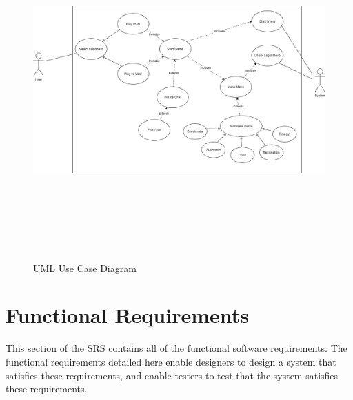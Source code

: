 \documentclass[]{article}
\begin{document}
\begin{figure}[ht]
    \centering
    \includegraphics[width=50em,height=35em]{UseCaseDiagram.png}
    \caption{UML Use Case Diagram}
    \label{fig:usecase}
\end{figure}

\section{Functional Requirements}
\label{sec:functional_requirements}
This section of the SRS contains all of the functional software requirements. The functional requirements detailed here enable designers to design a system that satisfies these requirements, and enable testers to test that the system satisfies these requirements.
\end{document}
